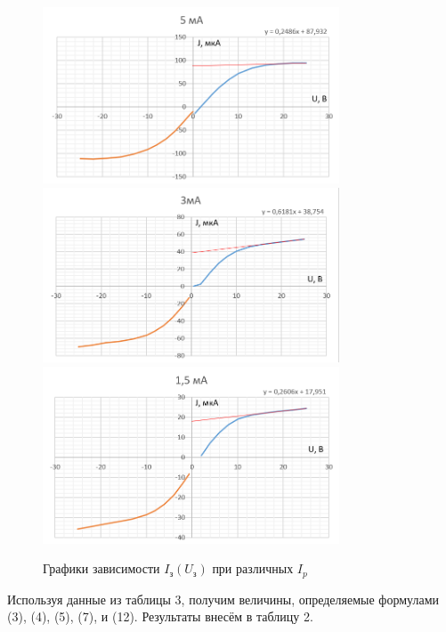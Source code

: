 \documentclass[a4paper]{article}
\theoremstyle{definition}
\theoremstyle{remark}
\begin{document}
    \begin{figure}[h!]
        \centering
        \includegraphics[width = 250pt]{image/graph5.png}
        \includegraphics[width = 250pt]{image/graph3.png}
        \includegraphics[width = 250pt]{image/graph15.png}
        \caption{Графики зависимости $I_{\text{з}}(U_{\text{з}})$ при различных $I_p$}
    \end{figure}

    Используя данные из таблицы 3, получим величины, определяемые формулами (3), (4), (5), (7), и (12). Результаты внесём в таблицу 2.
\end{document}
